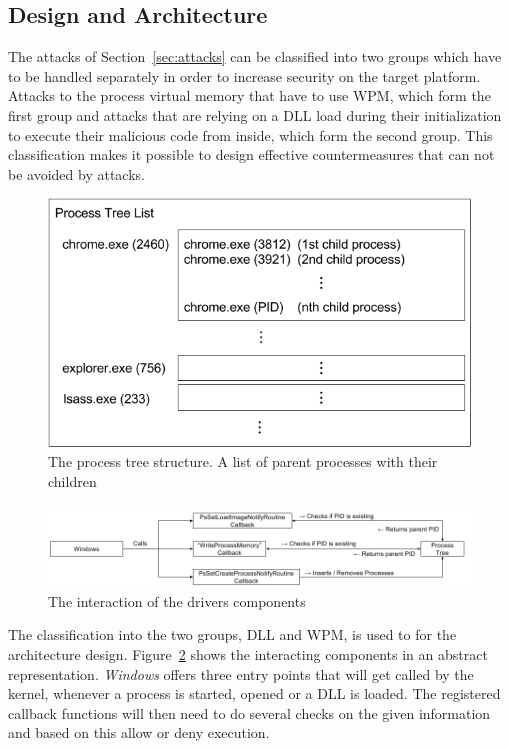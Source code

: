 \subsection{Design and Architecture}
The attacks of Section~\ref{sec:attacks} can be classified into two groups which have to be handled separately in order to increase security on the target platform. Attacks to the process virtual memory that have to use \gls{WPM}, which form the first group and attacks that are relying on a \gls{DLL} load during their initialization to execute their malicious code from inside, which form the second group. This classification makes it possible to design effective countermeasures that can not be avoided by attacks.
\begin{figure}[h]
\centering
\includegraphics[scale=0.6]{sections/implementation/listoflists.png}
\caption{The process tree structure. A list of parent processes with their children}
\label{fig:listoflists}
\end{figure}
\begin{figure}[!p]
\centering
\includegraphics[angle=90,scale=0.6]{sections/implementation/interaction.png}
\caption{The interaction of the drivers components}
\label{fig:interaction}
\end{figure}
The classification into the two groups, \gls{DLL} and \gls{WPM}, is used to for the architecture design. Figure~\ref{fig:interaction} shows the interacting components in an abstract representation. \emph{Windows} offers three entry points that will get called by the kernel, whenever a process is started, opened or a \gls{DLL} is loaded. The registered callback functions will then need to do several checks on the given information and based on this allow or deny execution.  
